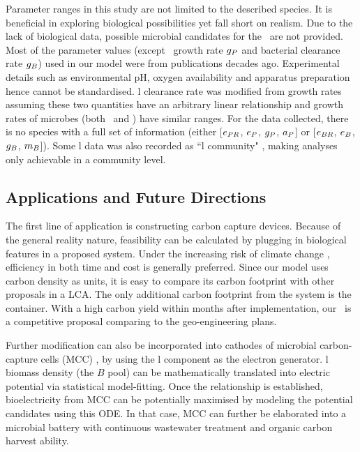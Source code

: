 \documentclass[../thesis.tex]{subfiles} %
\begin{document}
Parameter ranges in this study are not limited to the described species.  It is beneficial in exploring biological possibilities yet fall short on realism.  Due to the lack of biological data, possible microbial candidates for the \pbs\ are not provided.  Most of the parameter values (except \phy\ growth rate $g_P$ and bacterial clearance rate $g_B$) used in our model were from publications decades ago.  Experimental details such as environmental pH, oxygen availability and apparatus preparation hence cannot be standardised.  \Bac l clearance rate was modified from growth rates assuming these two quantities have an arbitrary linear relationship and growth rates of microbes (both \phy\ and \bac) have similar ranges.  For the data collected, there is no species with a full set of information (either [$e_{PR}$, $e_P$, $g_P$, $a_P$] or [$e_{BR}$, $e_B$, $g_B$, $m_B$]).  Some \bac l data was also recorded as ``\bac l community" \autocite{cochran1988estimation}, making analyses only achievable in a community level.

\subsection{Applications and Future Directions}
The first line of application is constructing carbon capture devices.  Because of the general reality nature, feasibility can be calculated by plugging in biological features in a proposed system.  Under the increasing risk of climate change \autocite{notz2016observed,schuur2015climate}, efficiency in both time and cost is generally preferred.  Since our model uses carbon density as units, it is easy to compare its carbon footprint with other proposals in a LCA.  The only additional carbon footprint from the system is the container.  With a high carbon yield within months after implementation, our \pbs\ is a competitive proposal comparing to the geo-engineering plans.

Further modification can also be incorporated into cathodes of microbial carbon-capture cells (MCC) \autocite{varanasi2020improvement,mohamed2020bioelectricity,neethu2018enhancement,pandit2012microbial}, by using the \bac l component as the electron generator.  \Bac l biomass density (the $B$ pool) can be mathematically translated into electric potential via statistical model-fitting.  Once the relationship is established, bioelectricity from MCC can be potentially maximised by modeling the potential candidates using this ODE.  In that case, MCC can further be elaborated into a microbial battery with continuous wastewater treatment \autocite{mohamed2020bioelectricity} and organic carbon harvest ability.
\end{document}
